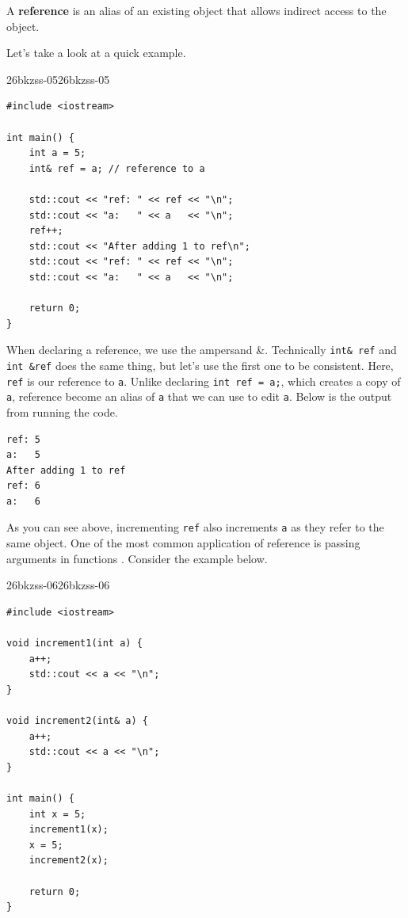 \documentclass[../../../main.tex]{subfiles}
\begin{document}
\begin{definition}{}{}
A \textbf{reference} is an alias of an existing object that allows
indirect access to the object.
\end{definition}

Let's take a look at a quick example.

\begin{cppbox}{26bkzss-05}{26bkzss-05}
\begin{lstlisting}[style=cppstyle]
#include <iostream>

int main() {
    int a = 5;
    int& ref = a; // reference to a

    std::cout << "ref: " << ref << "\n";
    std::cout << "a:   " << a   << "\n";
    ref++;
    std::cout << "After adding 1 to ref\n";
    std::cout << "ref: " << ref << "\n";
    std::cout << "a:   " << a   << "\n";

    return 0;
}
\end{lstlisting}
\end{cppbox}

When declaring a reference, we use the ampersand \&. Technically
\verb|int& ref| and \verb|int &ref| does the same thing, but let's
use the first one to be consistent. Here, \verb|ref| is our
reference to \verb|a|. Unlike declaring \verb|int ref = a;|, which
creates a copy of \verb|a|, reference become an alias of \verb|a|
that we can use to edit \verb|a|. Below is the output from running
the code.

\begin{outputbox}
\begin{lstlisting}[style=basic]
ref: 5
a:   5
After adding 1 to ref
ref: 6
a:   6
\end{lstlisting}
\end{outputbox}

As you can see above, incrementing \verb|ref| also increments \verb|a|
as they refer to the same object. One of the most common application
of reference is passing arguments in functions \cite{CS02-5}.
Consider the example below.

\begin{cppbox}{26bkzss-06}{26bkzss-06}
\begin{lstlisting}[style=cppstyle]
#include <iostream>

void increment1(int a) {
    a++;
    std::cout << a << "\n";
}

void increment2(int& a) {
    a++;
    std::cout << a << "\n";
}

int main() {
    int x = 5;
    increment1(x);
    x = 5;
    increment2(x);

    return 0;
}
\end{lstlisting}
\end{cppbox}
\end{document}

